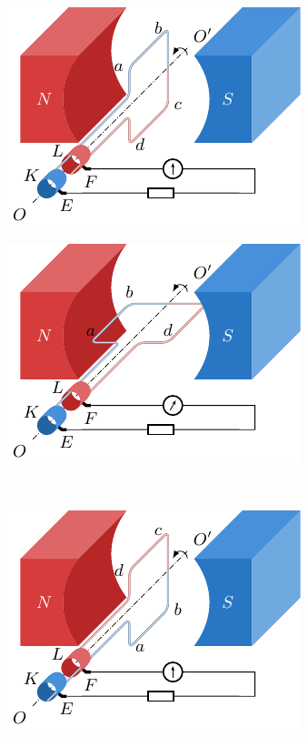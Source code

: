 \begin{figure}[htbp]
    \centering
    \begin{subfigure}{0.4\linewidth}
        \centering
        \includegraphics{fig/C/3-1a.pdf}
        \caption{}\label{fig_C_3-1a}
    \end{subfigure}
    \hfil
    \begin{subfigure}{0.4\linewidth}
        \centering
        \includegraphics{fig/C/3-1b.pdf}
        \caption{}\label{fig_C_3-1b}
    \end{subfigure}
    \\
    \begin{subfigure}{0.4\linewidth}
        \centering
        \includegraphics{fig/C/3-1c.pdf}

\end{subfigure}
\end{figure}
